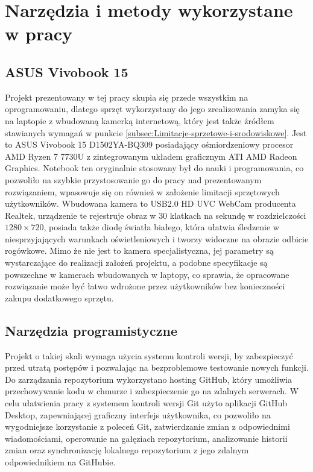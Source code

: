 \documentclass[a4paper,twoside,12pt]{book}
\begin{document}
\section{Narzędzia i metody wykorzystane w pracy}
\label{sec:Narzedzia-i-metody-wykorzystane-w-pracy}

\subsection{ASUS Vivobook 15}
\label{subsec:ASUS-Vivobook-15}

Projekt prezentowany w tej pracy skupia się przede wszystkim na oprogramowaniu, dlatego sprzęt wykorzystany do jego zrealizowania zamyka się na laptopie z wbudowaną kamerką internetową, który jest także źródłem stawianych wymagań w punkcie \ref{subsec:Limitacje-sprzetowe-i-srodowiskowe}. Jest to ASUS Vivobook 15 D1502YA-BQ309 posiadający ośmiordzeniowy procesor AMD Ryzen 7 7730U z zintegrowanym układem graficznym ATI AMD Radeon Graphics. Notebook ten oryginalnie stosowany był do nauki i programowania, co pozwoliło na szybkie przystosowanie go do pracy nad prezentowanym rozwiązaniem, wpasowuje się on również w założenie limitacji sprzętowych użytkowników. Wbudowana kamera to USB2.0 HD UVC WebCam producenta Realtek, urządzenie te rejestruje obraz w $30$ klatkach na sekundę w rozdzielczości $1280 \times 720$, posiada także diodę światła białego, która ułatwia śledzenie w niesprzyjających warunkach oświetleniowych i tworzy widoczne na obrazie odbicie rogówkowe. Mimo że nie jest to kamera specjalistyczna, jej parametry są wystarczające do realizacji założeń projektu, a podobne specyfikacje są powszechne w kamerach wbudowanych w laptopy, co sprawia, że opracowane rozwiązanie może być łatwo wdrożone przez użytkowników bez konieczności zakupu dodatkowego sprzętu.

\subsection{Narzędzia programistyczne}

Projekt o takiej skali wymaga użycia systemu kontroli wersji, by zabezpieczyć przed utratą postępów i pozwalając na bezproblemowe testowanie nowych funkcji. Do zarządzania repozytorium wykorzystano hosting GitHub, który umożliwia przechowywanie kodu w chmurze i zabezpieczenie go na zdalnych serwerach. W celu ułatwienia pracy z systemem kontroli wersji Git użyto aplikacji GitHub Desktop, zapewniającej graficzny interfejs użytkownika, co pozwoliło na wygodniejsze korzystanie z poleceń Git, zatwierdzanie zmian z odpowiednimi wiadomościami, operowanie na gałęziach repozytorium, analizowanie historii zmian oraz synchronizację lokalnego repozytorium z jego zdalnym odpowiednikiem na GitHubie.
\end{document}
